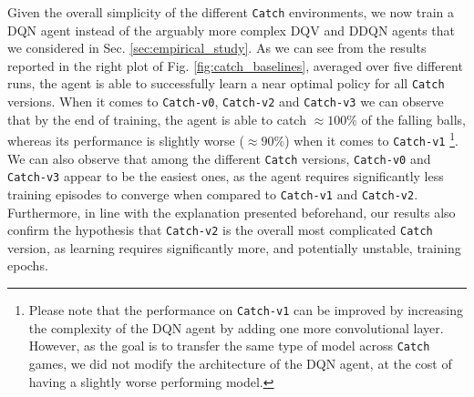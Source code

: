 Given the overall simplicity of the different \texttt{Catch} environments, we now train a DQN agent instead of the arguably more complex DQV and DDQN agents that we considered in Sec. \ref{sec:empirical_study}. As we can see from the results reported in the right plot of Fig. \ref{fig:catch_baselines}, averaged over five different runs, the agent is able to successfully learn a near optimal policy for all \texttt{Catch} versions. When it comes to \texttt{Catch-v0}, \texttt{Catch-v2} and \texttt{Catch-v3} we can observe that by the end of training, the agent is able to catch $\approx 100\%$ of the falling balls, whereas its performance is slightly worse ($\approx 90\%$) when it comes to \texttt{Catch-v1} \footnote{Please note that the performance on \texttt{Catch-v1} can be improved by increasing the complexity of the DQN agent by adding one more convolutional layer. However, as the goal is to transfer the same type of model across \texttt{Catch} games, we did not modify the architecture of the DQN agent, at the cost of having a slightly worse performing model.}. We can also observe that among the different \texttt{Catch} versions, \texttt{Catch-v0} and \texttt{Catch-v3} appear to be the easiest ones, as the agent requires significantly less training episodes to converge when compared to \texttt{Catch-v1} and \texttt{Catch-v2}. Furthermore, in line with the explanation presented beforehand, our results also confirm the hypothesis that \texttt{Catch-v2} is the overall most complicated \texttt{Catch} version, as learning requires significantly more, and potentially unstable, training epochs.



